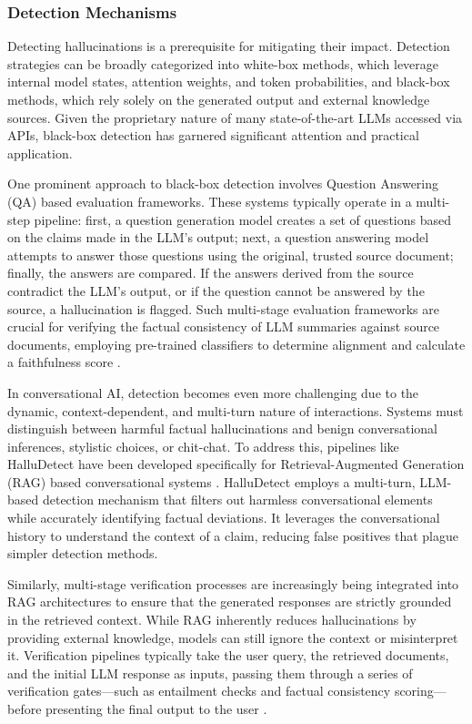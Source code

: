 \documentclass[11pt,a4paper]{article}
\begin{document}
\subsubsection{Detection Mechanisms}

Detecting hallucinations is a prerequisite for mitigating their impact. Detection strategies can be broadly categorized into white-box methods, which leverage internal model states, attention weights, and token probabilities, and black-box methods, which rely solely on the generated output and external knowledge sources. Given the proprietary nature of many state-of-the-art LLMs accessed via APIs, black-box detection has garnered significant attention and practical application.

One prominent approach to black-box detection involves Question Answering (QA) based evaluation frameworks. These systems typically operate in a multi-step pipeline: first, a question generation model creates a set of questions based on the claims made in the LLM's output; next, a question answering model attempts to answer those questions using the original, trusted source document; finally, the answers are compared. If the answers derived from the source contradict the LLM's output, or if the question cannot be answered by the source, a hallucination is flagged. Such multi-stage evaluation frameworks are crucial for verifying the factual consistency of LLM summaries against source documents, employing pre-trained classifiers to determine alignment and calculate a faithfulness score \cite{You_2025_Plainqafact}.

In conversational AI, detection becomes even more challenging due to the dynamic, context-dependent, and multi-turn nature of interactions. Systems must distinguish between harmful factual hallucinations and benign conversational inferences, stylistic choices, or chit-chat. To address this, pipelines like HalluDetect have been developed specifically for Retrieval-Augmented Generation (RAG) based conversational systems \cite{Anaokar_2025_Halludetect}. HalluDetect employs a multi-turn, LLM-based detection mechanism that filters out harmless conversational elements while accurately identifying factual deviations. It leverages the conversational history to understand the context of a claim, reducing false positives that plague simpler detection methods.

Similarly, multi-stage verification processes are increasingly being integrated into RAG architectures to ensure that the generated responses are strictly grounded in the retrieved context. While RAG inherently reduces hallucinations by providing external knowledge, models can still ignore the context or misinterpret it. Verification pipelines typically take the user query, the retrieved documents, and the initial LLM response as inputs, passing them through a series of verification gates---such as entailment checks and factual consistency scoring---before presenting the final output to the user \cite{Paudel_2025_Hallucinot}.
\end{document}

